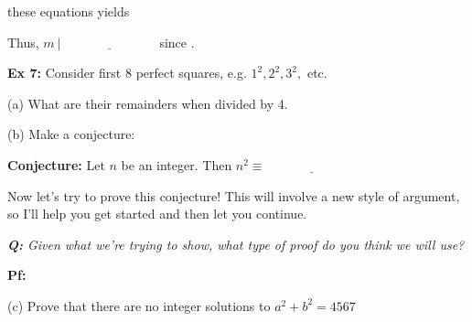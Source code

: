 \documentclass[fleqn]{article}
\theoremstyle{definition}
\begin{document}
	\vspace{.75cm}
	\underline{\hspace{3.5cm}} these equations yields

	\vspace{3cm}
	Thus, $m \ | \ \underline{\hspace{3cm}}$ since \underline{\hspace{2.5cm}}. 

	\vspace{1.5cm}



\newpage 


\textbf{Ex 7:} Consider first 8 perfect squares, e.g. $1^2, 2^2, 3^2,$ etc. 

\vspace{.25cm}
(a) What are their remainders when divided by 4. 

\vspace{2cm}
(b) Make a conjecture: 

\vspace{.25cm}
\hspace{1cm} \textbf{Conjecture:} Let $n$ be an integer. Then $n^2 \equiv \underline{\hspace{3cm}}$

\vspace{.25cm}
Now let's try to prove this conjecture! This will involve a new style of argument, so I'll help you get started and then let you continue. 

\vspace{.5cm}
{\it \textbf{Q:} Given what we're trying to show, what type of proof do you think we will use? }

	\vspace{1.5cm}
	\textbf{Pf:} 


\newpage


(c) Prove that there are no integer solutions to $a^2+b^2=4567$
\end{document}
